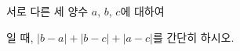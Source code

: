 서로 다른 세 양수 $a$, $b$, $c$에 대하여\par\smallskip{}\par\smallskip\noindent 일 때, $|b-a|+|b-c|+|a-c|$를 간단히 하시오.
